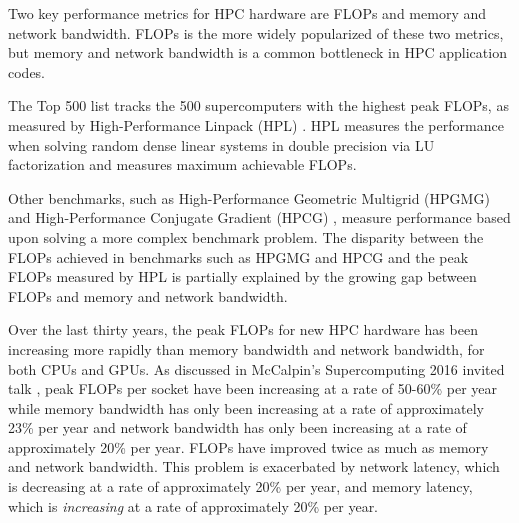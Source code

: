 Two key performance metrics for HPC hardware are FLOPs and memory and network bandwidth.
FLOPs is the more widely popularized of these two metrics, but memory and network bandwidth is a common bottleneck in HPC application codes. 

The Top 500 \cite{meuertop500} list tracks the 500 supercomputers with the highest peak FLOPs, as measured by High-Performance Linpack (HPL) \cite{petitethpl}.
HPL measures the performance when solving random dense linear systems in double precision via LU factorization and measures maximum achievable FLOPs.

Other benchmarks, such as High-Performance Geometric Multigrid (HPGMG) \cite{adams2014hpgmg} and High-Performance Conjugate Gradient (HPCG) \cite{dongarra2016high}, measure performance based upon solving a more complex benchmark problem.
The disparity between the FLOPs achieved in benchmarks such as HPGMG and HPCG and the peak FLOPs measured by HPL is partially explained by the growing gap between FLOPs and memory and network bandwidth.

Over the last thirty years, the peak FLOPs for new HPC hardware has been increasing more rapidly than memory bandwidth and network bandwidth, for both CPUs and GPUs.
As discussed in McCalpin's Supercomputing 2016 invited talk \cite{mccalpin2016memory}, peak FLOPs per socket have been increasing at a rate of 50-60\% per year while memory bandwidth has only been increasing at a rate of approximately 23\% per year and network bandwidth has only been increasing at a rate of approximately 20\% per year.
FLOPs have improved twice as much as memory and network bandwidth.
This problem is exacerbated by network latency, which is decreasing at a rate of approximately 20\% per year, and memory latency, which is \textit{increasing} at a rate of approximately 20\% per year.

